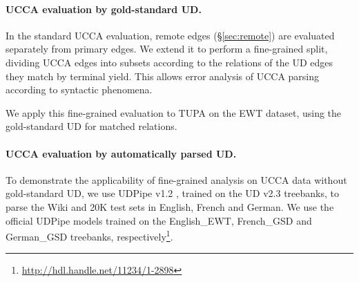 \documentclass[11pt,a4paper]{article}
\begin{document}
\paragraph{UCCA evaluation by gold-standard UD.}

In the standard UCCA evaluation,
remote edges (\S\ref{sec:remote}) are evaluated separately from primary edges.
We extend it to perform a fine-grained split,
dividing UCCA edges into subsets according to the relations of the UD edges
they match by terminal yield.
This allows error analysis of UCCA parsing according to syntactic phenomena.

We apply this fine-grained evaluation to TUPA on the EWT dataset,
using the gold-standard UD for matched relations.


\paragraph{UCCA evaluation by automatically parsed UD.}

To demonstrate the applicability of fine-grained analysis on UCCA data
without gold-standard UD,
we use UDPipe v1.2 \cite{udpipe,udpipe:2017}, trained on the UD v2.3 treebanks,
to parse the Wiki and 20K test sets in English, French and German.
We use the official UDPipe models trained on the English\_EWT, French\_GSD and German\_GSD
treebanks, respectively\footnote{\url{http://hdl.handle.net/11234/1-2898}}.


%

%
\end{document}

